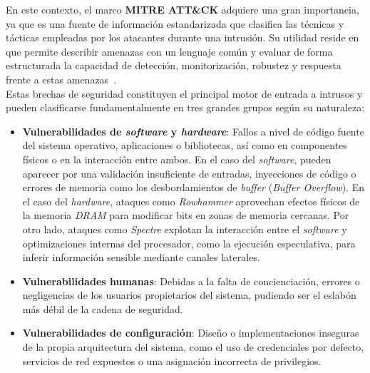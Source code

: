 En este contexto, el marco \textbf{MITRE ATT\&CK} adquiere una gran importancia, ya que es una fuente de información estandarizada que clasifica las técnicas y tácticas empleadas por los atacantes durante una intrusión.
Su utilidad reside en que permite describir amenazas con un lenguaje común y evaluar de forma estructurada la capacidad de detección, monitorización, robustez y respuesta frente a estas amenazas~\cite{mitre_attack}.\\

Estas brechas de seguridad constituyen el principal motor de entrada a intrusos y pueden clasificarse fundamentalmente en tres grandes grupos según su naturaleza:
\begin{itemize}
    \item \textbf{Vulnerabilidades de \textit{software} y \textit{hardware}}: Fallos a nivel de código fuente del sistema operativo, aplicaciones o bibliotecas, así como en componentes físicos o en la interacción entre ambos.
    En el caso del \textit{software}, pueden aparecer por una validación insuficiente de entradas, inyecciones de código o errores de memoria como los desbordamientos de \textit{buffer} (\textit{Buffer Overflow}).
    En el caso del \textit{hardware}, ataques como \textit{Rowhammer} aprovechan efectos físicos de la memoria \textit{DRAM} para modificar bits en zonas de memoria cercanas.
    Por otro lado, ataques como \textit{Spectre} explotan la interacción entre el \textit{software} y optimizaciones internas del procesador, como la ejecución especulativa, para inferir información sensible mediante canales laterales.
    \item \textbf{Vulnerabilidades humanas}: Debidas a la falta de concienciación, errores o negligencias de los usuarios propietarios del sistema, pudiendo ser el eslabón más débil de la cadena de seguridad.
    \item \textbf{Vulnerabilidades de configuración}: Diseño o implementaciones inseguras de la propia arquitectura del sistema, como el uso de credenciales por defecto, servicios de red expuestos o una asignación incorrecta de privilegios.
\end{itemize}

\

